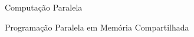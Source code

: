 \begin{section}{Computação Paralela}
\begin{subsection}{Programação Paralela em Memória Compartilhada}
\end{subsection}

\end{section}

